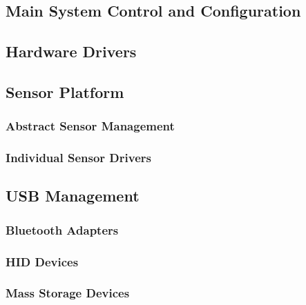 \FloatBarrier
\subsection{Main System Control and Configuration}


\FloatBarrier
\subsection{Hardware Drivers}


\FloatBarrier
\subsection{Sensor Platform}


\FloatBarrier
\subsubsection{Abstract Sensor Management}


\FloatBarrier
\subsubsection{Individual Sensor Drivers}


\FloatBarrier
\subsection{USB Management}


\FloatBarrier
\subsubsection{Bluetooth Adapters}


\FloatBarrier
\subsubsection{HID Devices}


\FloatBarrier
\subsubsection{Mass Storage Devices}

